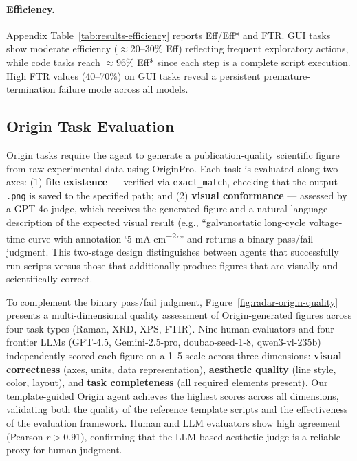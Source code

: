\documentclass{article}
\begin{document}
\paragraph{Efficiency.}
Appendix Table~\ref{tab:results-efficiency} reports Eff/Eff* and FTR.
GUI tasks show moderate efficiency ($\approx$20--30\% Eff) reflecting frequent
exploratory actions, while code tasks reach $\approx$96\% Eff* since each step is a
complete script execution.
High FTR values (40--70\%) on GUI tasks reveal a persistent premature-termination
failure mode across all models.

\subsection{Origin Task Evaluation}
\label{sec:origin-eval}

Origin tasks require the agent to generate a publication-quality scientific figure
from raw experimental data using OriginPro.
Each task is evaluated along two axes:
(1) \textbf{file existence} — verified via \texttt{exact\_match}, checking that the output
\texttt{.png} is saved to the specified path;
and (2) \textbf{visual conformance} — assessed by a GPT-4o judge, which receives the generated
figure and a natural-language description of the expected visual result
(e.g., ``galvanostatic long-cycle voltage-time curve with annotation `5 mA cm\textsuperscript{$-2$}'''
and returns a binary pass/fail judgment.
This two-stage design distinguishes between agents that successfully run scripts versus
those that additionally produce figures that are visually and scientifically correct.

To complement the binary pass/fail judgment,
Figure~\ref{fig:radar-origin-quality} presents a multi-dimensional quality assessment
of Origin-generated figures across four task types (Raman, XRD, XPS, FTIR).
Nine human evaluators and four frontier LLMs
(GPT-4.5, Gemini-2.5-pro, doubao-seed-1-8, qwen3-vl-235b)
independently scored each figure on a 1--5 scale across three dimensions:
\textbf{visual correctness} (axes, units, data representation),
\textbf{aesthetic quality} (line style, color, layout),
and \textbf{task completeness} (all required elements present).
Our template-guided Origin agent achieves the highest scores across all dimensions,
validating both the quality of the reference template scripts and the effectiveness
of the evaluation framework.
Human and LLM evaluators show high agreement (Pearson $r > 0.91$),
confirming that the LLM-based aesthetic judge is a reliable proxy for human judgment.
\end{document}
